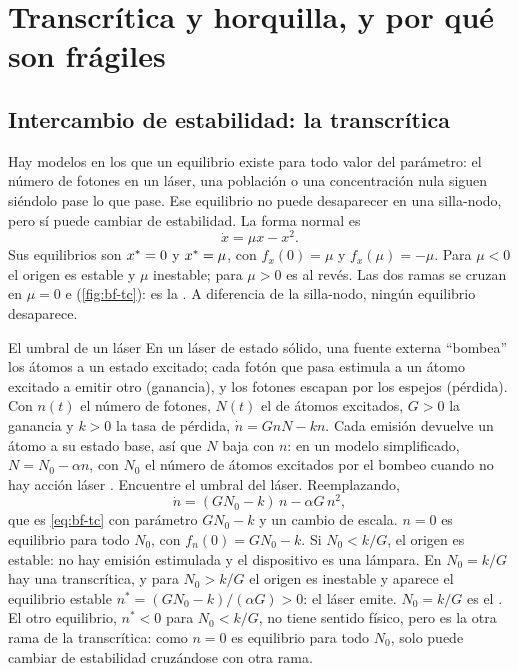 \section{Transcrítica y horquilla, y por qué son frágiles}
\label{sec:bf-transcritica}

\subsection{Intercambio de estabilidad: la transcrítica}

Hay modelos en los que un equilibrio existe para todo valor del parámetro: el número de fotones en un láser, una población o una concentración nula siguen siéndolo pase lo que pase. Ese equilibrio no puede desaparecer en una silla-nodo, pero sí puede cambiar de estabilidad. La forma normal es
\begin{equation}
  \dot x=\mu x-x^2 .
  \label{eq:bf-tc}
\end{equation}
Sus equilibrios son $x^{*}=0$ y $x^{*}=\mu$, con $f_x(0)=\mu$ y $f_x(\mu)=-\mu$. Para $\mu<0$ el origen es estable y $\mu$ inestable; para $\mu>0$ es al revés. Las dos ramas se cruzan en $\mu=0$ e  (\cref{fig:bf-tc}): es la . A diferencia de la silla-nodo, ningún equilibrio desaparece.

\begin{ejemplo}[label=ej:bf-laser]{El umbral de un láser}
En un láser de estado sólido, una fuente externa ``bombea'' los átomos a un estado excitado; cada fotón que pasa estimula a un átomo excitado a emitir otro (ganancia), y los fotones escapan por los espejos (pérdida). Con $n(t)$ el número de fotones, $N(t)$ el de átomos excitados, $G>0$ la ganancia y $k>0$ la tasa de pérdida, $\dot n=GnN-kn$. Cada emisión devuelve un átomo a su estado base, así que $N$ baja con $n$: en un modelo simplificado, $N=N_0-\alpha n$, con $N_0$ el número de átomos excitados por el bombeo cuando no hay acción láser \citep[\S3.3]{Str15}. Encuentre el umbral del láser.
\solucion Reemplazando,
\[
  \dot n=(GN_0-k)\,n-\alpha G\,n^2 ,
\]
que es \eqref{eq:bf-tc} con parámetro $GN_0-k$ y un cambio de escala. $n=0$ es equilibrio para todo $N_0$, con $f_n(0)=GN_0-k$. Si $N_0<k/G$, el origen es estable: no hay emisión estimulada y el dispositivo es una lámpara. En $N_0=k/G$ hay una transcrítica, y para $N_0>k/G$ el origen es inestable y aparece el equilibrio estable $n^*=(GN_0-k)/(\alpha G)>0$: el láser emite. $N_0=k/G$ es el . El otro equilibrio, $n^*<0$ para $N_0<k/G$, no tiene sentido físico, pero es la otra rama de la transcrítica: como $n=0$ es equilibrio para todo $N_0$, solo puede cambiar de estabilidad cruzándose con otra rama.
\end{ejemplo}

